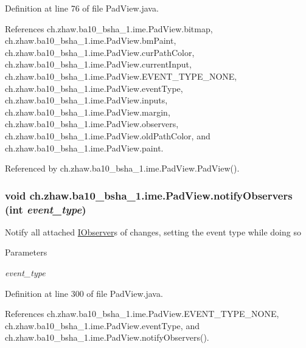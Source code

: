 Definition at line 76 of file PadView.java.

References ch.zhaw.ba10\_\-bsha\_\-1.ime.PadView.bitmap, ch.zhaw.ba10\_\-bsha\_\-1.ime.PadView.bmPaint, ch.zhaw.ba10\_\-bsha\_\-1.ime.PadView.curPathColor, ch.zhaw.ba10\_\-bsha\_\-1.ime.PadView.currentInput, ch.zhaw.ba10\_\-bsha\_\-1.ime.PadView.EVENT\_\-TYPE\_\-NONE, ch.zhaw.ba10\_\-bsha\_\-1.ime.PadView.eventType, ch.zhaw.ba10\_\-bsha\_\-1.ime.PadView.inputs, ch.zhaw.ba10\_\-bsha\_\-1.ime.PadView.margin, ch.zhaw.ba10\_\-bsha\_\-1.ime.PadView.observers, ch.zhaw.ba10\_\-bsha\_\-1.ime.PadView.oldPathColor, and ch.zhaw.ba10\_\-bsha\_\-1.ime.PadView.paint.

Referenced by ch.zhaw.ba10\_\-bsha\_\-1.ime.PadView.PadView().\hypertarget{classch_1_1zhaw_1_1ba10__bsha__1_1_1ime_1_1PadView_aa3a0e6aedfc80225bf47ce3cce17db27}{
\subsubsection[{notifyObservers}]{\setlength{\rightskip}{0pt plus 5cm}void ch.zhaw.ba10\_\-bsha\_\-1.ime.PadView.notifyObservers (int {\em event\_\-type})}}
\label{classch_1_1zhaw_1_1ba10__bsha__1_1_1ime_1_1PadView_aa3a0e6aedfc80225bf47ce3cce17db27}
Notify all attached \hyperlink{interfacech_1_1zhaw_1_1ba10__bsha__1_1_1ime_1_1IObserver}{IObserver}s of changes, setting the event type while doing so


\begin{DoxyParams}{Parameters}
\item[{\em event\_\-type}]\end{DoxyParams}


Definition at line 300 of file PadView.java.

References ch.zhaw.ba10\_\-bsha\_\-1.ime.PadView.EVENT\_\-TYPE\_\-NONE, ch.zhaw.ba10\_\-bsha\_\-1.ime.PadView.eventType, and ch.zhaw.ba10\_\-bsha\_\-1.ime.PadView.notifyObservers().

